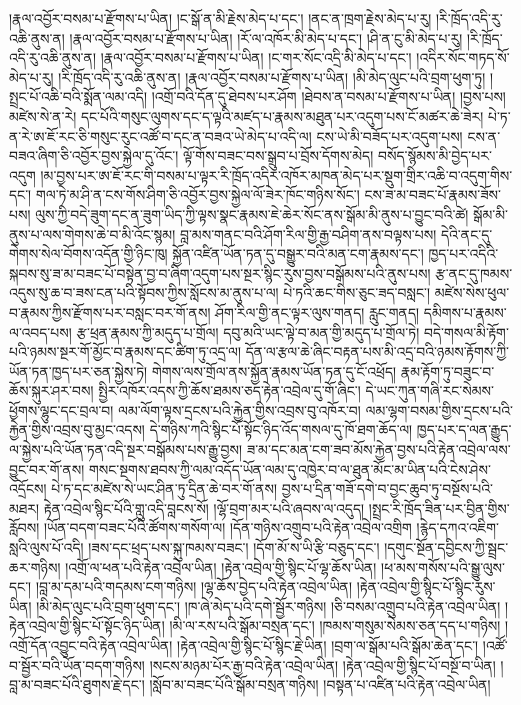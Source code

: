 \documentclass{article}
\begin{document}
།རྣལ་འབྱོར་བསམ་པ་རྫོགས་པ་ཡིན། །ང་སྒོ་ན་མི་རྗེས་མེད་པ་དང་། །ནང་ན་ཁྲག་རྗེས་མེད་པ་རུ། །རི་ཁྲོད་འདི་རུ་འཆི་ནུས་ན། །རྣལ་འབྱོར་བསམ་པ་རྫོགས་པ་ཡིན། །རོ་ལ་འཁོར་མི་མེད་པ་དང་། །ཤི་ན་ངུ་མི་མེད་པ་རུ། །རི་ཁྲོད་འདི་རུ་འཆི་ནུས་ན། །རྣལ་འབྱོར་བསམ་པ་རྫོགས་པ་ཡིན། །ང་གར་སོང་འདྲི་མི་མེད་པ་དང་། །འདིར་སོང་གཏད་སོ་མེད་པ་རུ། །རི་ཁྲོད་འདི་རུ་འཆི་ནུས་ན། །རྣལ་འབྱོར་བསམ་པ་རྫོགས་པ་ཡིན། །མི་མེད་ལུང་པའི་བྲག་ཕུག་ཏུ། །སྤྲང་པོ་འཆི་བའི་སྨོན་ལམ་འདི། །འགྲོ་བའི་དོན་དུ་ཐེབས་པར་ཤོག །ཐེབས་ན་བསམ་པ་རྫོགས་པ་ཡིན། །བྱས་པས། མཛེས་སེ་ན་རེ། དང་པོའི་གསུང་ལུགས་དང་ད་ལྟའི་མཛད་པ་རྣམས་མཐུན་པར་འདུག་པས་ངོ་མཚར་ཆེ་ཟེར། པེ་ཏ་ན་རེ་ཨ་ཇོ་རང་ཅི་གསུང་རུང་འཚོ་བ་དང་ན་བཟའ་ཡེ་མེད་པ་འདི་ལ། ངས་ཡེ་མི་བཟོད་པར་འདུག་པས། ངས་ན་བཟའ་ཞིག་ཅི་འབྱོར་བྱས་སྐྱེལ་དུ་འོང་། ལྟོ་གོས་བཟང་བས་སྒྲུབ་པ་བྲོས་དོགས་མེད། བསོད་སྙོམས་མི་བྱེད་པར་འདུག །མ་བྱས་པར་ཨ་ཇོ་རང་གི་བསམ་པ་ལྟར་རི་ཁྲོད་འདིར་འཁོར་མཁན་མེད་པར་སྡུག་གྲིར་འཆི་བ་འདུག་གིས་དང་། གལ་ཏེ་མ་ཤི་ན་ངས་གོས་ཤིག་ཅི་འབྱོར་བྱས་སྐྱེལ་ལོ་ཟེར་ཁོང་གཉིས་སོང་། ངས་ཟ་མ་བཟང་པོ་རྣམས་ཟོས་པས། ལུས་ཀྱི་བདེ་ཟུག་དང་ན་ཟུག་ཡིད་ཀྱི་ལྟས་སྣང་རྣམས་ཇེ་ཆེར་སོང་ནས་སྒོམ་མི་ནུས་པ་བྱུང་བའི་ཚེ། སྒོམ་མི་ནུས་པ་ལས་གེགས་ཆེ་བ་མི་འོང་སྙམ། བླ་མས་གནང་བའི་ཤོག་རིལ་གྱི་རྒྱ་བཤིག་ནས་བལྟས་པས། དེའི་ནང་དུ་གེགས་སེལ་བོགས་འདོན་གྱི་ཉིང་ཁུ། སྐྱོན་འཛིན་ཡོན་ཏན་དུ་བསྒྱུར་བའི་མན་ངག་རྣམས་དང་། ཁྱད་པར་འདིའི་སྐབས་སུ་ཟ་མ་བཟང་པོ་བསྟེན་བྱ་བ་ཞིག་འདུག་པས་སྔར་སྙིང་རུས་བྱས་བསྒོམས་པའི་ནུས་པས། རྩ་ནང་དུ་ཁམས་འདུས་སུ་ཆ་བ་ཟས་ངན་པའི་སྟོབས་ཀྱིས་སློངས་མ་ནུས་པ་ལ། པེ་ཏའི་ཆང་གིས་ཅུང་ཟད་བསླང་། མཛེས་སེས་ཕུལ་བ་རྣམས་ཀྱིས་རྫོགས་པར་བསླང་བར་གོ་ནས། ཤོག་རིལ་གྱི་ནང་ལྟར་ལུས་གནད། རླུང་གནད། དམིགས་པ་རྣམས་ལ་འབད་པས། རྩ་ཕྲན་རྣམས་ཀྱི་མདུད་པ་གྲོལ། དབུ་མའི་ཡང་ལྟེ་བ་མན་གྱི་མདུད་པ་གྲོལ་ཏེ། བདེ་གསལ་མི་རྟོག་པའི་ཉམས་སྔར་གོ་མྱོང་བ་རྣམས་དང་ཚིག་ཏུ་འདྲ་ལ། དོན་ལ་རྩལ་ཆེ་ཞིང་བརྟན་པས་མི་འདྲ་བའི་ཉམས་རྟོགས་ཀྱི་ཡོན་ཏན་ཁྱད་པར་ཅན་སྐྱེས་ཏེ། གེགས་ལས་གྲོལ་ནས་སྐྱོན་རྣམས་ཡོན་ཏན་དུ་ངོ་འཕྲོད། རྣམ་རྟོག་ཏུ་བཟུང་བ་ཆོས་སྐུར་ཤར་བས། སྤྱིར་འཁོར་འདས་ཀྱི་ཆོས་ཐམས་ཅད་རྟེན་འབྲེལ་དུ་གོ་ཞིང་། དེ་ཡང་ཀུན་གཞི་རང་སེམས་ཕྱོགས་ལྷུང་དང་བྲལ་བ། ལམ་ལོག་ལྟས་དྲངས་པའི་རྐྱེན་གྱིས་འབྲས་བུ་འཁོར་བ། ལམ་ལྷག་བསམ་གྱིས་དྲངས་པའི་རྐྱེན་གྱིས་འབྲས་བུ་མྱང་འདས། དེ་གཉིས་ཀའི་སྙིང་པོ་སྟོང་ཉིད་འོད་གསལ་དུ་ཁོ་ཐག་ཆོད་ལ། ཁྱད་པར་ད་ལན་རྒྱུད་ལ་སྐྱེས་པའི་ཡོན་ཏན་འདི་སྔར་བསྒོམས་པས་རྒྱུ་བྱས། ཟ་མ་དང་མན་ངག་ཟབ་མོས་རྐྱེན་བྱས་པའི་རྟེན་འབྲེལ་ལས་བྱུང་བར་གོ་ནས། གསང་སྔགས་ཐབས་ཀྱི་ལམ་འདོད་ཡོན་ལམ་དུ་འཁྱེར་བ་ལ་ཐུན་མོང་མ་ཡིན་པའི་ངེས་ཤེས་འདྲོངས། པེ་ཏ་དང་མཛེས་སེ་ཡང་ཤིན་ཏུ་དྲིན་ཆེ་བར་གོ་ནས། བྱས་པ་དྲིན་གཟོ་དགེ་བ་བྱང་ཆུབ་ཏུ་བསྔོས་པའི་མཐར། རྟེན་འབྲེལ་སྙིང་པོའི་གླུ་འདི་བླངས་སོ། །ལྷོ་བྲག་མར་པའི་ཞབས་ལ་འདུད། །སྤྲང་རི་ཁྲོད་ཟིན་པར་བྱིན་གྱིས་རློབས། །ཡོན་བདག་བཟང་པོའི་ཚོགས་གསོག་ལ། །དོན་གཉིས་འགྲུབ་པའི་རྟེན་འབྲེལ་འགྲིག །རྙེད་དཀའ་འཇིག་སླའི་ལུས་པོ་འདི། །ཟས་དང་ཕྲད་པས་སྐུ་ཁམས་བཟང་། །དོག་མོ་ས་ཡི་རྩི་བཅུད་དང་། །དགུང་སྔོན་དབྱིངས་ཀྱི་སྦྲང་ཆར་གཉིས། །འགྲོ་ལ་ཕན་པའི་རྟེན་འབྲེལ་ཡིན། །རྟེན་འབྲེལ་གྱི་སྙིང་པོ་ལྷ་ཆོས་ཡིན། །ཕ་མས་གསོས་པའི་སྒྱུ་ལུས་དང་། །བླ་མ་དམ་པའི་གདམས་ངག་གཉིས། །ལྷ་ཆོས་བྱེད་པའི་རྟེན་འབྲེལ་ཡིན། །རྟེན་འབྲེལ་གྱི་སྙིང་པོ་སྙིང་རུས་ཡིན། །མི་མེད་ལུང་པའི་བྲག་ཕུག་དང་། །ཁ་ཞེ་མེད་པའི་དགེ་སྦྱོར་གཉིས། །ཅི་བསམ་འགྲུབ་པའི་རྟེན་འབྲེལ་ཡིན། །རྟེན་འབྲེལ་གྱི་སྙིང་པོ་སྟོང་ཉིད་ཡིན། །མི་ལ་རས་པའི་སྒོམ་བསྲན་དང་། །ཁམས་གསུམ་སེམས་ཅན་དད་པ་གཉིས། །འགྲོ་དོན་འབྱུང་བའི་རྟེན་འབྲེལ་ཡིན། །རྟེན་འབྲེལ་གྱི་སྙིང་པོ་སྙིང་རྗེ་ཡིན། །བྲག་ལ་སྒོམ་པའི་སྒོམ་ཆེན་དང་། །འཚོ་བ་སྦྱོར་བའི་ཡོན་བདག་གཉིས། །སངས་མཉམ་པོར་རྒྱ་བའི་རྟེན་འབྲེལ་ཡིན། །རྟེན་འབྲེལ་གྱི་སྙིང་པོ་བསྔོ་བ་ཡིན། །བླ་མ་བཟང་པོའི་ཐུགས་རྗེ་དང་། །སློབ་མ་བཟང་པོའི་སྒོམ་བསྲན་གཉིས། །བསྟན་པ་འཛིན་པའི་རྟེན་འབྲེལ་ཡིན། 
\end{document}
